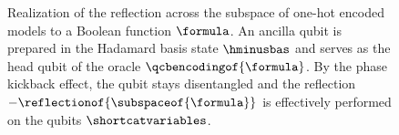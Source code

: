 \begin{figure}[t]
    \begin{center}
        
    \end{center}
    \caption{
        Realization of the reflection across the subspace of one-hot encoded models to a Boolean function $\formula$.
        An ancilla qubit is prepared in the Hadamard basis state $\hminusbas$ and serves as the head qubit of the oracle $\qcbencodingof{\formula}$.
        By the phase kickback effect, the qubit stays disentangled and the reflection $-\reflectionof{\subspaceof{\formula}}$ is effectively performed on the qubits $\shortcatvariables$.
    }
    \label{fig:reflectionCCRealization}
\end{figure}
